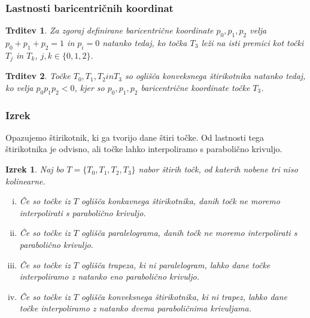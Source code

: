 \documentclass{beamer}
\newtheorem{izrek}{Izrek}
\newtheorem{trditev}{Trditev}
\begin{document}

\begin{frame}

\frametitle{Lastnosti baricentričnih koordinat}

\begin{trditev}\label{vektorp}
Za zgoraj definirane baricentrične koordinate $p_0, p_1, p_2 $ velja $p_0 + p_1 + p_2 = 1$ in $p_i = 0$ natanko tedaj, ko točka $T_3$ leži na isti premici kot točki $T_j$ in $T_k$, $j, k \in \{0, 1, 2 \}$.
\end{trditev}

\begin{trditev}\label{konveks}
Točke $T_0, T_1, T_2 in T_3$ so oglišča konveksnega štirikotnika natanko tedaj, ko velja $p_0 p_1 p_2 < 0$, kjer so $p_0, p_1, p_2$ baricentrične koordinate točke $T_3$.
\end{trditev}

\end{frame}


\begin{frame}
\frametitle{Izrek}

Opazujemo štirikotnik, ki ga tvorijo dane štiri točke. Od lastnosti tega štirikotnika je odvisno, ali točke lahko interpoliramo s parabolično krivuljo.

\begin{izrek}
Naj bo $T = \{ T_0, T_1, T_2, T_3 \}$ nabor štirih točk, od katerih nobene tri niso kolinearne.

\begin{enumerate}[i)]
\item Če so točke iz $T$ oglišča konkavnega štirikotnika, danih točk ne moremo interpolirati s parabolično krivuljo.
\item Če so točke iz $T$ oglišča paralelograma, danih točk ne moremo interpolirati s parabolično krivuljo.
\item Če so točke iz $T$ oglišča trapeza, ki ni paralelogram, lahko dane točke interpoliramo z natanko eno parabolično krivuljo.
\item Če so točke iz $T$ oglišča konveksnega štirikotnika, ki ni trapez, lahko dane točke interpoliramo z natanko dvema paraboličnima krivuljama.
\end{enumerate}

\end{izrek}

\end{frame}
\end{document}
